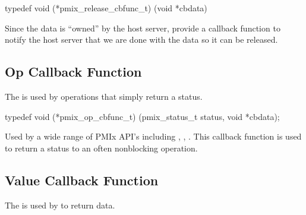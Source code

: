 \format

\cspecificstart
\begin{codepar}
typedef void (*pmix_release_cbfunc_t)
    (void *cbdata)
\end{codepar}
\cspecificend

\begin{arglist}
\end{arglist}

\descr

Since the data is ``owned'' by the host server, provide a callback function to notify the host server that we are done with the data so it can be released.


\subsection{Op Callback Function}

\summary

The  is used by operations that simply return a status.

\cspecificstart
\begin{codepar}
typedef void (*pmix_op_cbfunc_t)
    (pmix_status_t status, void *cbdata);
\end{codepar}
\cspecificend

\begin{arglist}
\end{arglist}

\descr

Used by a wide range of \ac{PMIx} API's including , , .
This callback function is used to return a status to an often nonblocking operation.


\subsection{Value Callback Function}

\summary

The  is used by  to return data.

